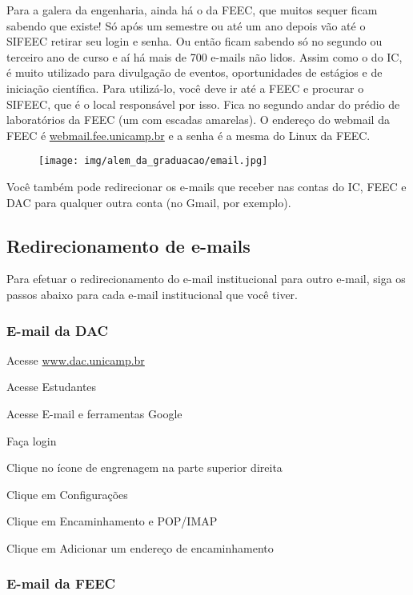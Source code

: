 Para a galera da engenharia, ainda há o da FEEC, que muitos sequer ficam
sabendo que existe! Só após um semestre ou até um ano depois vão até o SIFEEC
retirar seu login e senha. Ou então ficam sabendo só no segundo ou terceiro ano
de curso e aí há mais de 700 e-mails não lidos. Assim como o do IC, é muito
utilizado para divulgação de eventos, oportunidades de estágios e de iniciação
científica. Para utilizá-lo, você deve ir até a FEEC e procurar o SIFEEC, que é
o local responsável por isso. Fica no segundo andar do prédio de laboratórios
da FEEC (um com escadas amarelas). O endereço do webmail da FEEC é
\url{webmail.fee.unicamp.br} e a senha é a mesma do Linux da FEEC.

\begin{figure}[b!]
  \centering
  \texttt{[image: img/alem\_da\_graduacao/email.jpg]}
\end{figure}

Você também pode redirecionar os e-mails que receber nas contas do IC, FEEC e
DAC para qualquer outra conta (no Gmail, por exemplo).

\subsection{Redirecionamento de e-mails}
Para efetuar o redirecionamento do e-mail institucional para outro e-mail, siga
os passos abaixo para cada e-mail institucional que você tiver.

\subsubsection{E-mail da DAC}

\begin{compactenumerate}
\item Acesse \url{www.dac.unicamp.br}
\item Acesse Estudantes
\item Acesse E-mail e ferramentas Google
\item Faça login
\item Clique no ícone de engrenagem na parte superior direita
\item Clique em Configurações
\item Clique em Encaminhamento e POP/IMAP
\item Clique em Adicionar um endereço de encaminhamento
\end{compactenumerate}

\subsubsection{E-mail da FEEC}

